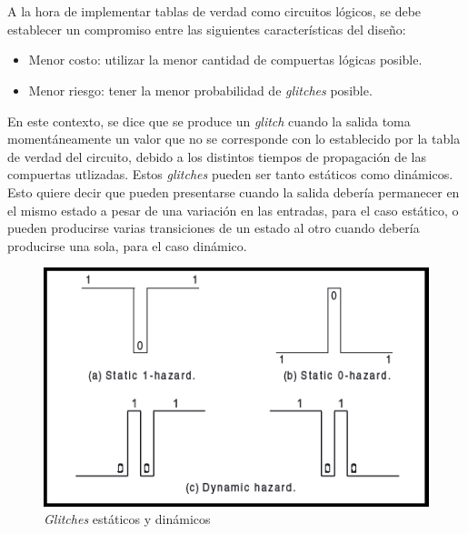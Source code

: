 \documentclass[../../e3_tp2_main.tex]{subfiles}
\begin{document}
\chapter{}

A la hora de implementar tablas de verdad como circuitos l\'ogicos, se debe establecer un compromiso entre las siguientes caracter\'isticas del dise\~no:

\begin{itemize}
	\item Menor costo: utilizar la menor cantidad de compuertas l\'ogicas posible.
	\item Menor riesgo: tener la menor probabilidad de \textit{glitches} posible.
\end{itemize}

En este contexto, se dice que se produce un \textit{glitch} cuando la salida toma moment\'aneamente un valor que no se corresponde con lo establecido por la tabla de verdad del circuito, debido a los distintos tiempos de propagaci\'on de las compuertas utlizadas. Estos \textit{glitches} pueden ser tanto est\'aticos como din\'amicos. Esto quiere decir que pueden presentarse cuando la salida deber\'ia permanecer en el mismo estado a pesar de una variaci\'on en las entradas, para el caso est\'atico, o pueden producirse varias transiciones de un estado al otro cuando deber\'ia producirse una sola, para el caso din\'amico.

\begin{figure}[H]
	\centering
	\includegraphics[scale=0.5]{hazard.png}
	\caption{\textit{Glitches} est\'aticos y din\'amicos \protect\footnotemark}
\end{figure}

\end{document}
